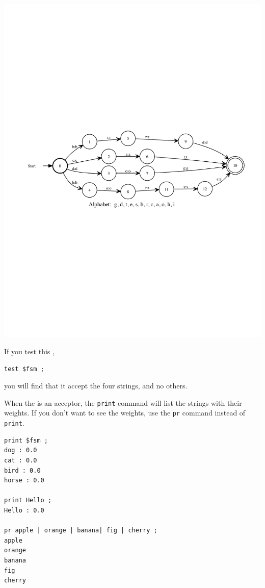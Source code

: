 \begin{center}
\includegraphics[width=135mm]{images/dogcatbirdhorse.pdf}
\end{center}

\noindent
If you test this \fsm{}, 

\begin{Verbatim}
test $fsm ;
\end{Verbatim}

\noindent
you will find that it accept the four strings, and no others.

When the \fsm{} is an acceptor, the \texttt{print} command will list the strings with their
weights.  If you don't want to see the weights, use the \texttt{pr}
command instead of \texttt{print}.

\begin{Verbatim}
print $fsm ;
dog : 0.0
cat : 0.0
bird : 0.0
horse : 0.0

print Hello ;
Hello : 0.0

pr apple | orange | banana| fig | cherry ;
apple
orange
banana
fig
cherry
\end{Verbatim}

